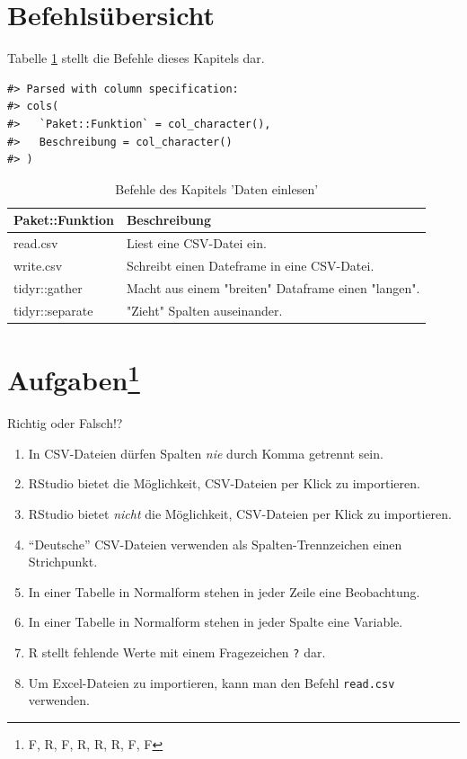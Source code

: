 \documentclass[12pt,ngerman,]{book}
\providecommand{\tightlist}{%
  \setlength{\itemsep}{0pt}\setlength{\parskip}{0pt}}
\let\rmarkdownfootnote\footnote%
\def\footnote{\protect\rmarkdownfootnote}
\let\BeginKnitrBlock\begin \let\EndKnitrBlock\end
\begin{document}
\section{Befehlsübersicht}\label{befehlsubersicht-1}

Tabelle \ref{tab:befehle-tidy} stellt die Befehle dieses Kapitels dar.

\begin{verbatim}
#> Parsed with column specification:
#> cols(
#>   `Paket::Funktion` = col_character(),
#>   Beschreibung = col_character()
#> )
\end{verbatim}

\begin{table}

\caption{\label{tab:befehle-tidy}Befehle des Kapitels 'Daten einlesen'}
\centering
\begin{tabular}[t]{l|l}
\hline
Paket::Funktion & Beschreibung\\
\hline
read.csv & Liest eine CSV-Datei ein.\\
\hline
write.csv & Schreibt einen Dateframe in eine CSV-Datei.\\
\hline
tidyr::gather & Macht aus einem "breiten" Dataframe einen "langen".\\
\hline
tidyr::separate & "Zieht" Spalten auseinander.\\
\hline
\end{tabular}
\end{table}

\section[Aufgaben]{\texorpdfstring{Aufgaben\footnote{F, R, F, R, R, R,
  F, F}}{Aufgaben}}\label{aufgaben-2}

\BeginKnitrBlock{rmdexercises}
Richtig oder Falsch!?

\begin{enumerate}
\def\labelenumi{\arabic{enumi}.}
\tightlist
\item
  In CSV-Dateien dürfen Spalten \emph{nie} durch Komma getrennt sein.
\item
  RStudio bietet die Möglichkeit, CSV-Dateien per Klick zu importieren.
\item
  RStudio bietet \emph{nicht} die Möglichkeit, CSV-Dateien per Klick zu
  importieren.
\item
  ``Deutsche'' CSV-Dateien verwenden als Spalten-Trennzeichen einen
  Strichpunkt.
\item
  In einer Tabelle in Normalform stehen in jeder Zeile eine Beobachtung.
\item
  In einer Tabelle in Normalform stehen in jeder Spalte eine Variable.
\item
  R stellt fehlende Werte mit einem Fragezeichen \texttt{?} dar.
\item
  Um Excel-Dateien zu importieren, kann man den Befehl \texttt{read.csv}
  verwenden.
\end{enumerate}
\EndKnitrBlock{rmdexercises}
\end{document}
